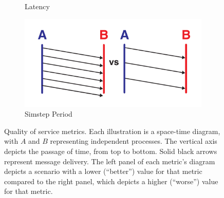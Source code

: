 \begin{figure}
\begin{subfigure}[b]{0.5\textwidth}
    \caption{Latency}
    \label{fig:quality-of-service-metric-definitions-latency}
  \end{subfigure}%
  \begin{subfigure}[b]{0.5\textwidth}
    \centering
    \includegraphics[width=\linewidth]{img/quality-of-service-metric-definitions/simstep-period.pdf}
    \caption{Simstep Period}
    \label{fig:quality-of-service-metric-definitions-simstep-period}
  \end{subfigure}%
  \caption{
  Quality of service metrics.
  Each illustration is a space-time diagram, with $A$ and $B$ representing independent processes.
  The vertical axis depicts the passage of time, from top to bottom.
  Solid black arrows represent message delivery.
  The left panel of each metric's diagram depicts a scenario with a lower (``better'') value for that metric compared to the right panel, which depicts a higher (``worse'') value for that metric.
  }
  \label{fig:quality-of-service-metric-definitions}
\end{figure}
